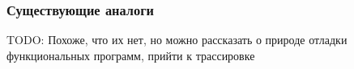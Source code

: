 \begin{frame}
\frametitle{Существующие аналоги} %
TODO: Похоже, что их нет, но можно рассказать о природе отладки функциональных программ, прийти к трассировке
\end{frame}
